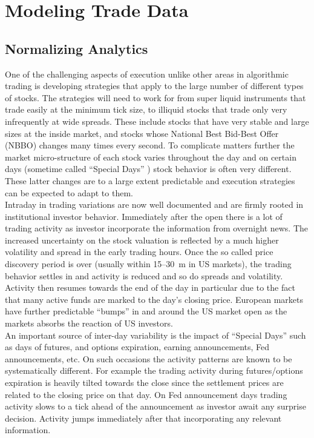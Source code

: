 
\chapter{Modeling Trade Data}

\section{Normalizing Analytics}
One of the challenging aspects of execution unlike other areas in algorithmic trading is developing strategies that apply to the large number of different types of stocks. The strategies will need to work for from super liquid instruments that trade easily at the minimum tick size, to illiquid stocks that trade only very infrequently at wide spreads. These include stocks that have very stable and large sizes at the inside market, and stocks whose National Best Bid-Best Offer (NBBO) changes many times every second. To complicate matters further the market micro-structure of each stock varies throughout the day and on certain days (sometime called ``Special Days'' ) stock behavior is often very different. These latter changes are to a large extent predictable and execution strategies can be expected to adapt to them. \\


Intraday in trading variations are now well documented and are firmly rooted in institutional investor behavior. Immediately after the open there is a lot of trading activity as investor incorporate the information from overnight news. The increased uncertainty on the stock valuation is reflected by a much higher volatility and spread in the early trading hours. Once the so called price discovery period is over (usually within 15--30~m in US markets), the trading behavior settles in and activity is reduced and so do spreads and volatility. Activity then resumes towards the end of the day in particular due to the  fact that many active funds are marked to the day's closing price. European markets have further predictable ``bumps'' in and around the US market open as the markets absorbs the reaction of US investors. \\


An important source of inter-day variability is the impact of ``Special Days'' such as days of futures, and options expiration, earning announcements, Fed announcements, etc. On such occasions the activity patterns are known to be systematically different. For  example the trading activity during futures/options expiration is heavily tilted towards the close since the settlement prices are related to the closing price on that day. On Fed announcement days trading activity slows to a tick ahead of the announcement as investor await any surprise decision. Activity jumps immediately after that incorporating any relevant information.


